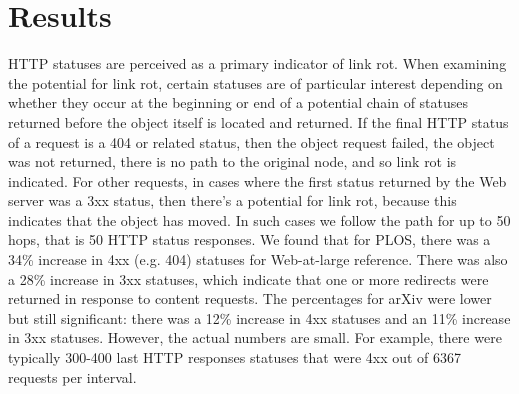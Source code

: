 \documentclass[12pt]{article}
\begin{document}
\section{Results}
HTTP statuses are perceived as a primary indicator of link rot. When examining the potential for link rot, certain statuses are of particular interest depending on whether they occur at the beginning or end of a potential chain of statuses returned before the object itself is located and returned. If the final HTTP status of a request is a 404 or related status, then the object request failed, the object was not returned, there is no path to the original node, and so link rot is indicated. For other requests, in cases where the first status returned by the Web server was a 3xx status, then there's a potential for link rot, because this indicates that the object has moved. In such cases we follow the path for up to 50 hops, that is 50 HTTP status responses. We found that for PLOS, there was a 34\% increase in 4xx (e.g. 404) statuses for Web-at-large reference. There was also a 28\% increase in 3xx statuses, which indicate that one or more redirects were returned in response to content requests. The percentages for arXiv were lower but still significant: there was a 12\% increase in 4xx statuses and an 11\% increase in 3xx statuses. However, the actual numbers are small. For example, there were typically 300-400 last HTTP responses statuses that were 4xx out of 6367 requests per interval. 
\end{document}
